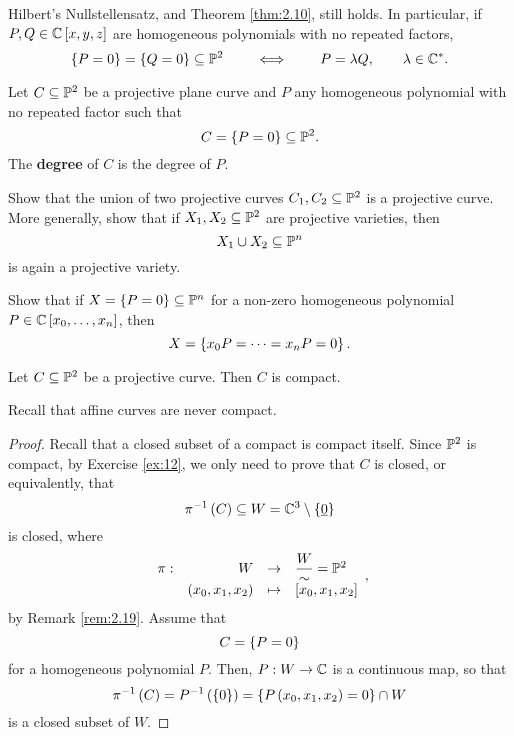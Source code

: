 \begin{remark}
\label{rem:4.12}
Hilbert's Nullstellensatz, and Theorem \ref{thm:2.10}, still holds. In particular, if $ P, Q \in \C\sb{x, y, z} $ are homogeneous polynomials with no repeated factors,
$$ \cb{P = 0} = \cb{Q = 0} \subseteq \P^2 \qquad \iff \qquad P = \lambda Q, \qquad \lambda \in \C^*. $$
\end{remark}

\begin{definition}
Let $ C \subseteq \P^2 $ be a projective plane curve and $ P $ any homogeneous polynomial with no repeated factor such that
$$ C = \cb{P = 0} \subseteq \P^2. $$
The \textbf{degree} of $ C $ is the degree of $ P $.
\end{definition}

\begin{exercise}
Show that the union of two projective curves $ C_1, C_2 \subseteq \P^2 $ is a projective curve. More generally, show that if $ X_1, X_2 \subseteq \P^2 $ are projective varieties, then
$$ X_1 \cup X_2 \subseteq \P^n $$
is again a projective variety.
\end{exercise}

\begin{exercise}
Show that if $ X = \cb{P = 0} \subseteq \P^n $ for a non-zero homogeneous polynomial $ P \in \C\sb{x_0, \dots, x_n} $, then
$$ X = \cb{x_0P = \dots = x_nP = 0}. $$
\end{exercise}

\begin{lemma}
Let $ C \subseteq \P^2 $ be a projective curve. Then $ C $ is compact.
\end{lemma}

Recall that affine curves are never compact.

\begin{proof}
Recall that a closed subset of a compact is compact itself. Since $ \P^2 $ is compact, by Exercise \ref{ex:12}, we only need to prove that $ C $ is closed, or equivalently, that
$$ \pi^{-1}\rb{C} \subseteq W = \C^3 \setminus \cb{\underline{0}} $$
is closed, where
$$ \function[\pi]{W}{\dfrac{W}{\sim} = \P^2}{\rb{x_0, x_1, x_2}}{\sb{x_0, x_1, x_2}}, $$
by Remark \ref{rem:2.19}. Assume that
$$ C = \cb{P = 0} $$
for a homogeneous polynomial $ P $. Then, $ P : W \to \C $ is a continuous map, so that
$$ \pi^{-1}\rb{C} = P^{-1}\rb{\cb{0}} = \cb{P\rb{x_0, x_1, x_2} = 0} \cap W $$
is a closed subset of $ W $.
\end{proof}

